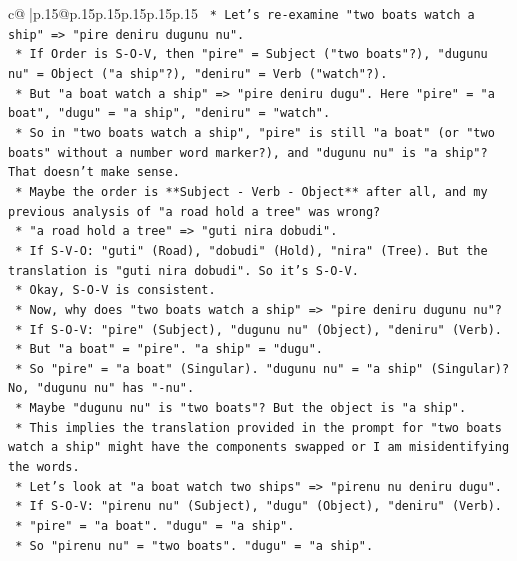 \documentclass{article}
\begin{document}
{\begin{supertabular}{c@{$\;$}|p{.15\linewidth}@{}p{.15\linewidth}p{.15\linewidth}p{.15\linewidth}p{.15\linewidth}p{.15\linewidth}}
{{{\texttt{        *   Let's re{-}examine "two boats watch a ship" => "pire deniru dugunu nu".} \\
\texttt{        *   If Order is S{-}O{-}V, then "pire" = Subject ("two boats"?), "dugunu nu" = Object ("a ship"?), "deniru" = Verb ("watch"?).} \\
\texttt{        *   But "a boat watch a ship" => "pire deniru dugu". Here "pire" = "a boat", "dugu" = "a ship", "deniru" = "watch".} \\
\texttt{        *   So in "two boats watch a ship", "pire" is still "a boat" (or "two boats" without a number word marker?), and "dugunu nu" is "a ship"? That doesn't make sense.} \\
\texttt{        *   Maybe the order is **Subject {-} Verb {-} Object** after all, and my previous analysis of "a road hold a tree" was wrong?} \\
\texttt{        *   "a road hold a tree" => "guti nira dobudi".} \\
\texttt{        *   If S{-}V{-}O: "guti" (Road), "dobudi" (Hold), "nira" (Tree). But the translation is "guti nira dobudi". So it's S{-}O{-}V.} \\
\texttt{        *   Okay, S{-}O{-}V is consistent.} \\
\texttt{        *   Now, why does "two boats watch a ship" => "pire deniru dugunu nu"?} \\
\texttt{        *   If S{-}O{-}V: "pire" (Subject), "dugunu nu" (Object), "deniru" (Verb).} \\
\texttt{        *   But "a boat" = "pire". "a ship" = "dugu".} \\
\texttt{        *   So "pire" = "a boat" (Singular). "dugunu nu" = "a ship" (Singular)? No, "dugunu nu" has "{-}nu".} \\
\texttt{        *   Maybe "dugunu nu" is "two boats"? But the object is "a ship".} \\
\texttt{        *   This implies the translation provided in the prompt for "two boats watch a ship" might have the components swapped or I am misidentifying the words.} \\
\texttt{        *   Let's look at "a boat watch two ships" => "pirenu nu deniru dugu".} \\
\texttt{        *   If S{-}O{-}V: "pirenu nu" (Subject), "dugu" (Object), "deniru" (Verb).} \\
\texttt{        *   "pire" = "a boat". "dugu" = "a ship".} \\
\texttt{        *   So "pirenu nu" = "two boats". "dugu" = "a ship".} \\
}}}
\end{supertabular}}
\end{document}
